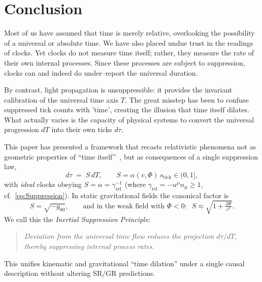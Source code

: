 \documentclass[12pt]{article}
\theoremstyle{plain}
\begin{document}
\section*{Conclusion}

Most of us have assumed that time is merely relative, overlooking the possibility of a universal or absolute time. We have also placed undue trust in the readings of clocks. Yet clocks do not measure time itself; rather, they measure the rate of their own internal processes. Since these processes are subject to suppression, clocks can and indeed do under–report the universal duration.

\medskip
\noindent
By contrast, light propagation is unsuppressible: it provides the invariant calibration of the universal time axis $T$. The great misstep has been to confuse suppressed tick counts with 'time', creating the illusion that time itself dilates. What actually varies is the capacity of physical systems to convert the universal progression $dT$ into their own ticks $d\tau$.

\medskip
\noindent
This paper has presented a framework that recasts relativistic phenomena not as geometric properties of “time itself”~\cite{Einstein1905,Minkowski1908}, but as consequences of a single suppression law,
\begin{equation}
d\tau \;=\; S\,dT,\qquad S=\alpha(v,\Phi)\,s_{\mathrm{tick}}\in(0,1],
\label{eq:ConclusionSuppression}
\end{equation}
with \emph{ideal} clocks obeying $S=\alpha=\gamma_{\mathrm{rel}}^{-1}$ (where $\gamma_{\mathrm{rel}}=-u^\mu n_\mu\ge1$, cf.~\eqref{eq:Suppression}). In static gravitational fields the canonical factor is
\begin{equation}
S=\sqrt{-g_{00}},\qquad\text{and in the weak field with }\Phi<0:\;\; S\approx\sqrt{1+\tfrac{2\Phi}{c^2}}.
\label{eq:ConclusionGR}
\end{equation}
We call this the \emph{Inertial Suppression Principle}:
\begin{quote}
\textit{Deviation from the universal time flow reduces the projection $d\tau/dT$, thereby suppressing internal process rates.}
\end{quote}
This unifies kinematic and gravitational “time dilation” under a single causal description without altering SR/GR predictions.
\end{document}
